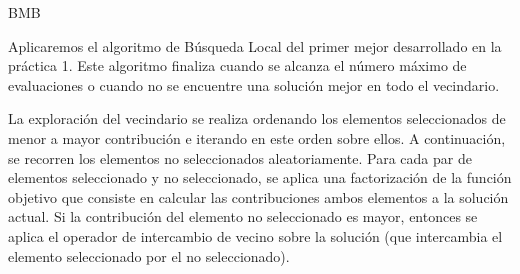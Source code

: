 \documentclass[10pt,a4paper]{article}
\begin{document}
\begin{algorithm}[H]
	\caption{BMB}
\end{algorithm}



Aplicaremos el algoritmo de Búsqueda Local del primer mejor desarrollado en la práctica 1. Este algoritmo finaliza cuando se alcanza el número máximo de evaluaciones o cuando no se encuentre una solución mejor en todo el vecindario.

La exploración del vecindario se realiza ordenando los elementos seleccionados de menor a mayor contribución e iterando en este orden sobre ellos. A continuación, se recorren los elementos no seleccionados aleatoriamente. Para cada par de elementos seleccionado y no seleccionado, se aplica una factorización de la función objetivo que consiste en calcular las contribuciones ambos elementos a la solución actual. Si la contribución del elemento no seleccionado es mayor, entonces se aplica el operador de intercambio de vecino sobre la solución (que intercambia el elemento seleccionado por el no seleccionado).\\
\end{document}
